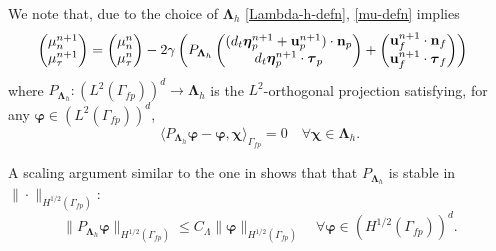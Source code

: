 \documentclass[11pt]{article}
\def\u{{\bf u}}
\def\n{{\bf n}}
\def\btau{\boldsymbol{\tau}}
\def\bbeta{\boldsymbol{\eta}}
\def\bchi{\boldsymbol{\chi}}
\def\bvarphi{\boldsymbol{\varphi}}
\def\bL{\boldsymbol{\Lambda}}
\def\<{\langle}
\def\>{\rangle}
\def\dt{d_t}
\begin{document}
We note that, due to the choice of $\bL_h$ \eqref{Lambda-h-defn}, \eqref{mu-defn} implies
\begin{align}
  \begin{pmatrix}\mu_n^{n+1}\\ \mu_{\tau}^{n+1} \end{pmatrix}  & =
  \begin{pmatrix} \mu_n^n\\ \mu_{\tau}^{n} \end{pmatrix} 
  - 2\gamma \left( P_{\bL_h} \begin{pmatrix} (\dt \bbeta_p^{n+1} + \u_p^{n+1})\cdot\n_p \\
    \dt \bbeta_p^{n+1} \cdot\btau_p \end{pmatrix}
  + \begin{pmatrix}\u_f^{n+1}\cdot\n_f \\\u_f^{n+1}\cdot\btau_f \end{pmatrix} \right)
  \label{mu-strong}  
\end{align}
%
where $P_{\bL_h}:(L^2(\Gamma_{fp}))^d \to \bL_h$ is the $L^2$-orthogonal projection satisfying, for any $\bvarphi \in (L^2(\Gamma_{fp}))^d$,
%
\begin{equation}\label{L2proj-lambda}
\big\<P_{\bL_h}\bvarphi - \bvarphi,\bchi\big\>_{\Gamma_{fp}} = 0 \quad \forall \bchi \in \bL_h.
\end{equation}

A scaling argument similar to the one in \cite[Lemma~5.1]{gvy2014}
shows that that $P_{\bL_h}$ is stable in $\|\cdot\|_{H^{1/2}(\Gamma_{fp})}$:
%  
\begin{equation}\label{H12-stable}
\|P_{\bL_h}\bvarphi\|_{H^{1/2}(\Gamma_{fp})} \le C_\Lambda \|\bvarphi\|_{H^{1/2}(\Gamma_{fp})} \quad \forall \bvarphi \in (H^{1/2}(\Gamma_{fp}))^d.
\end{equation}  
\end{document}
